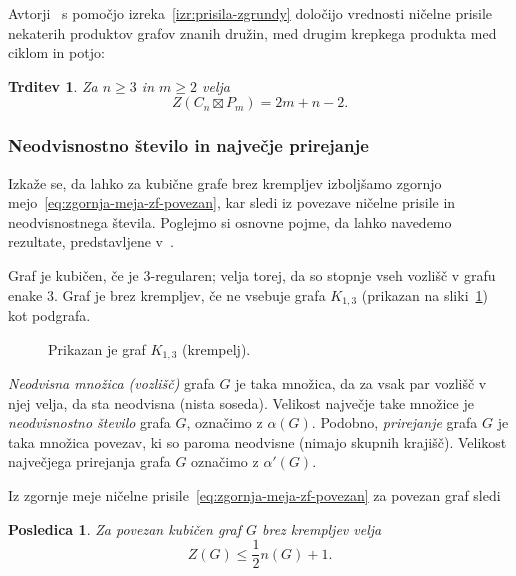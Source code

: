 \documentclass[12pt,a4paper,twoside]{article}
\theoremstyle{definition} %
\theoremstyle{plain} %
\newtheorem{trditev}[definicija]{Trditev}
\newtheorem{posledica}[definicija]{Posledica}
\numberwithin{equation}{section}  %
\begin{document}
Avtorji~\cite{bresar2017grundy} s pomočjo izreka~\ref{izr:prisila-zgrundy} določijo vrednosti ničelne prisile nekaterih produktov grafov znanih družin, med drugim krepkega produkta med ciklom in potjo:
\begin{trditev}{{\cite[trditev 2.5.]{bresar2017grundy}}}
    Za $n \geq 3$ in $m \geq 2$ velja
    \[ Z(C_n \boxtimes P_m) = 2m + n - 2 .\]
\end{trditev}

\subsubsection{Neodvisnostno število in največje prirejanje}

Izkaže se, da lahko za kubične grafe brez krempljev izboljšamo zgornjo mejo~\eqref{eq:zgornja-meja-zf-povezan}, kar sledi iz povezave ničelne prisile in neodvisnostnega števila. Poglejmo si osnovne pojme, da lahko navedemo rezultate, predstavljene v~\cite{davila2018claw}.

Graf je kubičen, če je 3-regularen; velja torej, da so stopnje vseh vozlišč v grafu enake 3. Graf je brez krempljev, če ne vsebuje grafa $K_{1,3}$ (prikazan na sliki~\ref{fig:krempelj}) kot podgrafa.

\begin{figure}[h]
    \centering
    \caption{Prikazan je graf $K_{1,3}$ (krempelj).}
    \label{fig:krempelj}
\end{figure}

\emph{Neodvisna množica (vozlišč)} grafa $G$ je taka množica, da za vsak par vozlišč v njej velja, da sta neodvisna (nista soseda). Velikost največje take množice je \emph{neodvisnostno število} grafa $G$, označimo z $\alpha(G)$. Podobno, \emph{prirejanje} grafa $G$ je taka množica povezav, ki so paroma neodvisne (nimajo skupnih krajišč). Velikost največjega prirejanja grafa $G$ označimo z $\alpha'(G)$.

Iz zgornje meje ničelne prisile~\eqref{eq:zgornja-meja-zf-povezan} za povezan graf sledi
\begin{posledica}
    Za povezan kubičen graf $G$ brez krempljev velja
    \[ Z(G) \leq \frac{1}{2}n(G) + 1. \]
\end{posledica}
\end{document}
